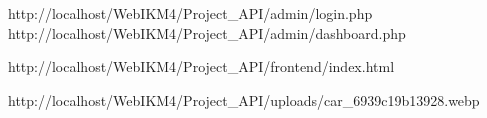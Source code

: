 http://localhost/WebIKM4/Project_API/admin/login.php
http://localhost/WebIKM4/Project_API/admin/dashboard.php

http://localhost/WebIKM4/Project_API/frontend/index.html

http://localhost/WebIKM4/Project_API/uploads/car_6939c19b13928.webp